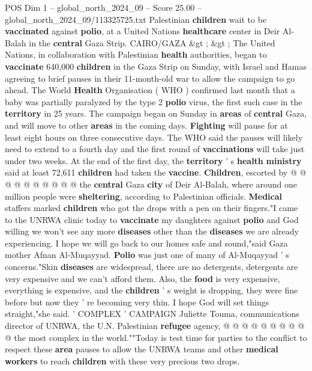 \begin{textsample}{POS Dim 1 – global\_north\_2024\_09 – Score 25.00 – global\_north\_2024\_09/113325725.txt}  \label{ex:f1_pos_426}
Palestinian \textbf{children} wait to be \textbf{vaccinated} against \textbf{polio}, at a United Nations \textbf{healthcare} center in Deir Al-Balah in the \textbf{central} Gaza Strip.
CAIRO/GAZA \&gt ; \&gt ; The United Nations, in collaboration with Palestinian \textbf{health} authorities, began to \textbf{vaccinate} 640,000 \textbf{children} in the Gaza Strip on Sunday, with Israel and Hamas agreeing to brief pauses in their 11-month-old war to allow the campaign to go ahead.
The World \textbf{Health} Organisation ( WHO ) confirmed last month that a baby was partially paralyzed by the type 2 \textbf{polio} virus, the first such case in the \textbf{territory} in 25 years.
The campaign began on Sunday in \textbf{areas} of \textbf{central} Gaza, and will move to other \textbf{areas} in the coming days. \textbf{Fighting} will pause for at least eight hours on three consecutive days.
The WHO said the pauses will likely need to extend to a fourth day and the first round of \textbf{vaccinations} will take just under two weeks.
At the end of the first day, the \textbf{territory} ' s \textbf{health} \textbf{ministry} said at least 72,611 \textbf{children} had taken the \textbf{vaccine}. \textbf{Children}, escorted by @ @ @ @ @ @ @ @ @ @ the \textbf{central} Gaza \textbf{city} of Deir Al-Balah, where around one million people were \textbf{sheltering}, according to Palestinian officials. \textbf{Medical} staffers marked \textbf{children} who got the drops with a pen on their fingers."I came to the UNRWA clinic today to \textbf{vaccinate} my daughters against \textbf{polio} and God willing we won't see any more \textbf{diseases} other than the \textbf{diseases} we are already experiencing.
I hope we will go back to our homes safe and sound,"said Gaza mother Afnan Al-Muqayyad. \textbf{Polio} was just one of many of Al-Muqayyad ' s concerns."Skin \textbf{diseases} are widespread, there are no detergents, detergents are very expensive and we can't afford them.
Also, the \textbf{food} is very expensive, everything is expensive, and the \textbf{children} ' s weight is dropping, they were fine before but now they ' re becoming very thin.
I hope God will set things straight,"she said. ' COMPLEX ' CAMPAIGN Juliette Touma, communications director of UNRWA, the U.N.
Palestinian \textbf{refugee} agency, @ @ @ @ @ @ @ @ @ @ the most complex in the world.""Today is test time for parties to the conflict to respect these \textbf{area} pauses to allow the UNRWA teams and other \textbf{medical} \textbf{workers} to reach \textbf{children} with these very precious two drops.

\end{textsample}
